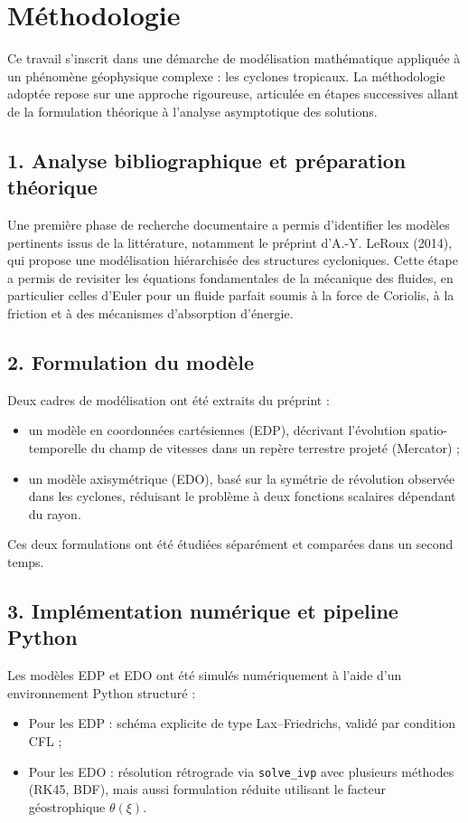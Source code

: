 \chapter{Méthodologie}

Ce travail s'inscrit dans une démarche de modélisation mathématique appliquée à un phénomène géophysique complexe : les cyclones tropicaux. La méthodologie adoptée repose sur une approche rigoureuse, articulée en étapes successives allant de la formulation théorique à l’analyse asymptotique des solutions.

\section*{1. Analyse bibliographique et préparation théorique}

Une première phase de recherche documentaire a permis d’identifier les modèles pertinents issus de la littérature, notamment le préprint d’A.-Y. LeRoux (2014), qui propose une modélisation hiérarchisée des structures cycloniques. Cette étape a permis de revisiter les équations fondamentales de la mécanique des fluides, en particulier celles d’Euler pour un fluide parfait soumis à la force de Coriolis, à la friction et à des mécanismes d’absorption d’énergie.

\section*{2. Formulation du modèle}

Deux cadres de modélisation ont été extraits du préprint :
\begin{itemize}
    \item un modèle en coordonnées cartésiennes (EDP), décrivant l’évolution spatio-temporelle du champ de vitesses dans un repère terrestre projeté (Mercator) ;
    \item un modèle axisymétrique (EDO), basé sur la symétrie de révolution observée dans les cyclones, réduisant le problème à deux fonctions scalaires dépendant du rayon.
\end{itemize}

Ces deux formulations ont été étudiées séparément et comparées dans un second temps.

\section*{3. Implémentation numérique et pipeline Python}

Les modèles EDP et EDO ont été simulés numériquement à l’aide d’un environnement Python structuré :
\begin{itemize}
    \item Pour les EDP : schéma explicite de type Lax–Friedrichs, validé par condition CFL ;
    \item Pour les EDO : résolution rétrograde via \texttt{solve\_ivp} avec plusieurs méthodes (RK45, BDF), mais aussi formulation réduite utilisant le facteur géostrophique $\theta(\xi)$.
\end{itemize}


